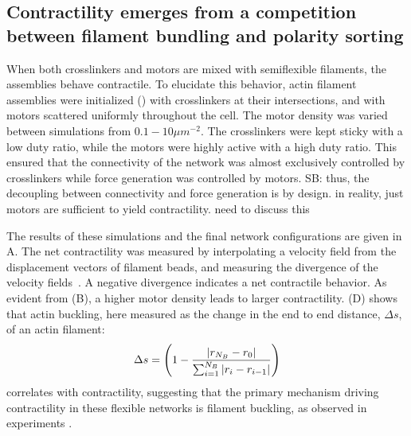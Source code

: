 \documentclass[11pt]{article}
\begin{document}
\subsection*{Contractility emerges from a competition between filament bundling and polarity sorting}
\par
When both crosslinkers and motors are {\color{red}mixed} with semiflexible filaments, the assemblies {\color{red}behave} contractile. 
To {\color{red}elucidate} this behavior, actin filament assemblies were initialized () with crosslinkers 
at their intersections, and with motors scattered uniformly throughout the cell. The motor density was varied between simulations from $0.1-10\mu m^{-2}$.
The crosslinkers were kept sticky with a low duty ratio, while the motors were highly active
with a high duty ratio. This ensured that the connectivity of the network was almost exclusively controlled by crosslinkers while force generation was controlled by motors. {\color{blue}SB: thus, the decoupling between connectivity and force generation is by design. in reality, just motors are sufficient to yield contractility. need to discuss this}
\par
The results of these {\color{red}simulations and the final network configurations are given} in A. The {\color{red}net} contractility was measured by
interpolating a velocity field from the displacement vectors of filament beads, and measuring the divergence of the
velocity fields~\cite{murrell2014}. A negative divergence indicates a net contractile {\color{red}behavior}. As evident from (B), a higher motor density leads to larger contractility. (D) shows
that actin buckling, here measured as the change in the end to end distance, $\Delta s$, of an actin filament:
\begin{equation}
  \Delta s = \left(1 - {|r_{N_B}-r_0|\over\sum_{i=1}^{N_B}{|r_i-r_{i-1}|}}\right) 
  \label{eqn:fil_strain}
\end{equation}
correlates with contractility, suggesting that the primary mechanism driving
contractility in these flexible networks is {\color{red}filament} buckling, as {\color{red}observed} in experiments \cite{murrell2012}. 
\end{document}
